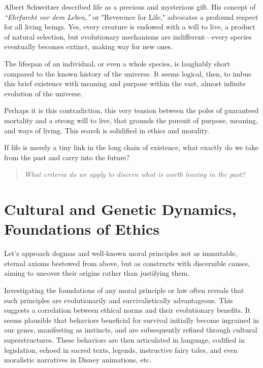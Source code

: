 \documentclass[11pt,a4]{article}
\begin{document}
    Albert Schweitzer described life as a precious and mysterious
    gift\cite{Schweitzer}. His concept of \textit{“Ehrfurcht vor dem Leben,”}
    or "Reverence for Life," advocates a profound respect for all living beings.
    Yes, every creature is endowed with a will to live, a product of
    natural selection, but evolutionary mechanisms are indifferent---every species eventually becomes
    extinct, making way for new ones.

    The lifespan of an individual, or even a whole species, is
    laughably short compared to the known history of the universe.
    It seems logical, then, to imbue this brief existence with
    meaning and purpose within the vast, almost infinite
    evolution of the universe.

    Perhaps it is this contradiction, this very tension
    between the poles of guaranteed mortality and a
    strong will to live, that grounds the pursuit of
    purpose, meaning, and ways of living. This search
    is solidified in ethics and morality.

    If life is merely a tiny link in the long chain of
    existence, what exactly do we take from the past
    and carry into the future?

    \begin{quote}
        \textit{What criteria
        do we apply to discern what is worth leaving in the past?}
    \end{quote}

\newpage
\section{Cultural and Genetic Dynamics, Foundations of Ethics}

    Let's approach dogmas and well-known moral principles not as
    immutable, eternal axioms bestowed from above, but as constructs
    with discernible causes, aiming to uncover their origins rather than
    justifying them.

    Investigating the foundations of any moral principle or law often
    reveals that such principles are evolutionarily and survivalistically
    advantageous. This suggests a correlation between ethical
    norms and their evolutionary benefits. It seems plausible
    that behaviors beneficial for
    survival initially become ingrained in our genes, manifesting as
    instincts, and are subsequently refined through cultural superstructures.
    These behaviors are then articulated in language,
    codified in legislation, echoed in sacred texts, legends,
    instructive fairy tales, and even moralistic narratives in
    Disney animations, etc.
\end{document}
